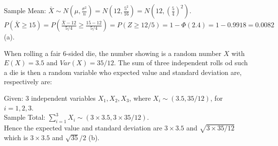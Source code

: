 \documentclass[bigtut]{tutorial}
\begin{document}
\begin{tutorial}
\begin{questions}
\begin{solution}
Sample Mean: $\bar{X} \sim N(\mu, \frac{\sigma^2}{n}) = N(12, \frac{5^2}{16}) = N(12, (\frac {5}{4})^2)$. \\
$P(\bar{X} \geq 15)  = P( \frac{\bar{X}-12}{5/4} \geq \frac{15-12}{5/4}) = 
P(Z \geq 12/5) = 1 - \Phi(2.4) = 1-0.9918 = 0.0082$ (a).
\end{solution}



\question
When rolling a fair 6-sided die, the number showing is a random number $X$ with $E(X)=3.5$ and $Var(X)=35/12$. The sum of three independent rolls od such a die is then a random variable who expected value and standard deviation are, respectively are:
\begin{solution}
Given: 3 independent variables $X_{1}, X_{2}, X_{3}$, where $X_{i} \sim (3.5, 35/12)$, for $i=1,2,3$.  \\
Sample Total: $\sum_{i=1}^{3} X_{i} \sim (3 \times 3.5, 3 \times 35/12)$. \\ 
Hence the expected value and standard deviation are $3 \times 3.5$ and  $\sqrt{3 \times 35/12}$ which is $3 \times 3.5$ and  $\sqrt{35}/2$ (b).
\end{solution}




\end{questions}
\end{tutorial}
\end{document}
